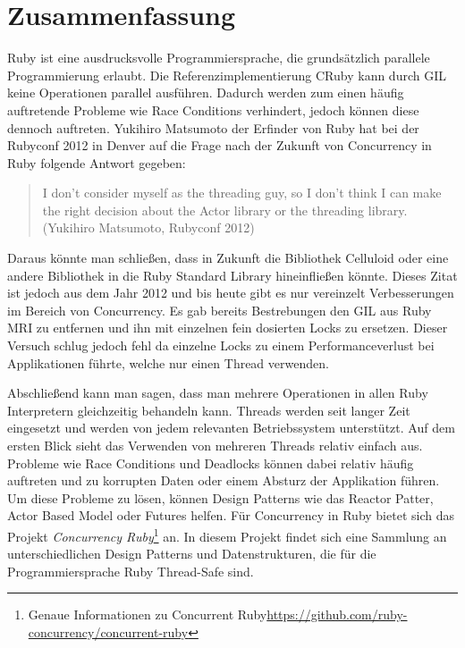 \section{Zusammenfassung}
Ruby ist eine ausdrucksvolle Programmiersprache, die grundsätzlich parallele Programmierung erlaubt. Die Referenzimplementierung CRuby kann durch GIL keine Operationen parallel ausführen. Dadurch werden zum einen häufig auftretende Probleme wie Race Conditions verhindert, jedoch können diese dennoch auftreten. Yukihiro Matsumoto der Erfinder von Ruby hat bei der Rubyconf 2012 in Denver auf die Frage nach der Zukunft von Concurrency in Ruby folgende Antwort gegeben:

\begin{quote}
I don't consider myself as the threading guy, so I don't think I can make the right decision about the Actor library or the threading library.
 (Yukihiro Matsumoto, Rubyconf 2012)
\end{quote}

Daraus könnte man schließen, dass in Zukunft die Bibliothek Celluloid oder eine andere Bibliothek in die Ruby Standard Library hineinfließen könnte. Dieses Zitat ist jedoch aus dem Jahr 2012 und bis heute gibt es nur vereinzelt Verbesserungen im Bereich von Concurrency. Es gab bereits Bestrebungen den GIL aus Ruby MRI zu entfernen und ihn mit einzelnen fein dosierten Locks zu ersetzen. Dieser Versuch schlug jedoch fehl da einzelne Locks zu einem Performanceverlust bei Applikationen führte, welche nur einen Thread verwenden. 

Abschließend kann man sagen, dass man mehrere Operationen in allen Ruby Interpretern gleichzeitig behandeln kann. Threads werden seit langer Zeit eingesetzt und werden von jedem relevanten Betriebssystem unterstützt. Auf dem ersten Blick sieht das Verwenden von mehreren Threads relativ einfach aus. Probleme wie Race Conditions und Deadlocks können dabei relativ häufig auftreten und zu korrupten Daten oder einem Absturz der Applikation führen. Um diese Probleme zu lösen, können Design Patterns wie das Reactor Patter, Actor Based Model oder Futures helfen. Für Concurrency in Ruby bietet sich das Projekt \emph{Concurrency Ruby}\footnote{Genaue Informationen zu Concurrent Ruby\url{https://github.com/ruby-concurrency/concurrent-ruby}} an. In diesem Projekt findet sich eine Sammlung an unterschiedlichen Design Patterns und Datenstrukturen, die für die Programmiersprache Ruby Thread-Safe sind.

